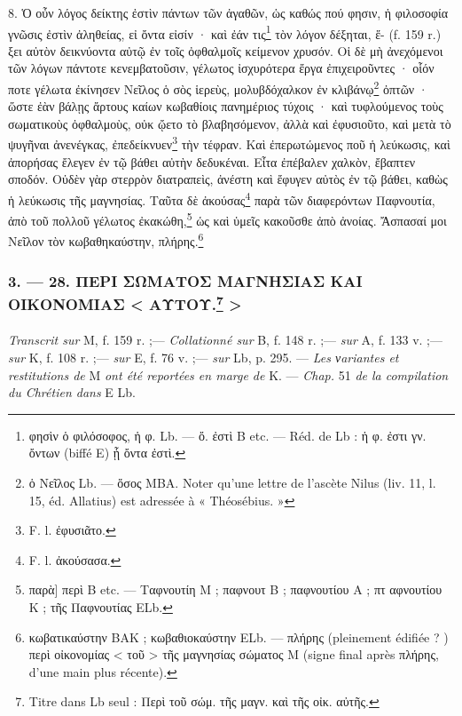 \documentclass[landscape, a4paper, 11pt, oneside, polutonikogreek, french]{article}
\begin{document}
8. Ὁ οὖν λόγος δείκτης ἐστὶν πάντων τῶν ἀγαθῶν, ὡς καθώς πού φησιν, ἡ φιλοσοφία γνῶσις ἐστὶν ἀληθείας, εἰ ὄντα εἰσίν · καὶ ἐάν τις\footnote{φησὶν ὁ φιλόσοφος, ἡ φ. Lb. --- ὄ. ἐστὶ B etc. --- Réd. de Lb : ἡ φ. ἐστι γν. ὄντων (biffé E) ᾗ ὄντα ἐστὶ.} τὸν λόγον δέξηται, ἕ- (f. 159 r.) ξει αὐτὸν δεικνύοντα αὐτῷ ἐν τοῖς ὀφθαλμοῖς κείμενον χρυσόν. Οἱ δὲ μὴ ἀνεχόμενοι τῶν λόγων πάντοτε κενεμβατοῦσιν, γέλωτος ἰσχυρότερα ἔργα ἐπιχειροῦντες · οἷόν ποτε γέλωτα ἐκίνησεν Νεῖλος ὁ σὸς ἱερεὺς, μολυβδόχαλκον ἐν κλιβάνῳ\footnote{ὁ Nεῖλος Lb. --- ὅσος MBA. Noter qu'une lettre de l'ascète Nilus (liv. 11, l. 15, éd. Allatius) est adressée à « Théosébius. »} ὀπτῶν · ὥστε ἐὰν βάλῃς ἄρτους καίων κωβαθίοις πανημέριος τύχοις · καὶ τυφλούμενος τοὺς σωματικοὺς ὀφθαλμοὺς, οὐκ ᾤετο τὸ βλαβησόμενον, ἀλλὰ καὶ ἐφυσιοῦτο, καὶ μετὰ τὸ ψυγῆναι ἀνενέγκας, ἐπεδείκνυεν\footnote{F. l. ἐφυσιᾶτο.} τὴν τέφραν. Καὶ ἐπερωτώμενος ποῦ ἡ λεύκωσις, καὶ ἀπορήσας ἔλεγεν ἐν τῷ βάθει αὐτὴν δεδυκέναι. Εἶτα ἐπέβαλεν χαλκὸν, ἔβαπτεν σποδόν. Οὐδὲν γὰρ στερρὸν διατραπεὶς, ἀνέστη καὶ ἔφυγεν αὐτὸς ἐν τῷ βάθει, καθὼς ἡ λεύκωσις τῆς μαγνησίας. Ταῦτα δὲ ἀκούσας\footnote{F. l. ἀκούσασα.} παρὰ τῶν διαφερόντων Παφνουτία, ἀπὸ τοῦ πολλοῦ γέλωτος ἐκακώθη,\footnote{παρὰ] περὶ B etc. --- Tαφνουτίη M ; παφνουτ B ; παφνουτίου A ; πτ αφνουτίου K ; τῆς Παφνουτίας ELb.} ὡς καὶ ὑμεῖς κακοῦσθε ἀπὸ ἀνοίας. Ἄσπασαί μοι Νεῖλον τὸν κωβαθηκαύστην, πλήρης.\footnote{κωβατικαύστην BAK ; κωβαθιοκαύστην ELb. --- πλήρης (pleinement édifiée ? ) περὶ οἰκονομίας < τοῦ > τῆς μαγνησίας σώματος M (signe final après πλήρης, d'une main plus récente).}

\bigskip
\centerline{\EightStarTaper}
\centerline{\EightStarTaper\EightStarTaper}
\bigskip

\subsubsection[3. --- 28. ΠΕΡΙ ΣΩΜΑΤΟΣ ΜΑΓΝΗΣΙΑΣ ΚΑΙ ΟΙΚΟΝΟΜΙΑΣ < ΑΥΤΟΥ. >]{3. --- 28. ΠΕΡΙ ΣΩΜΑΤΟΣ ΜΑΓΝΗΣΙΑΣ ΚΑΙ ΟΙΚΟΝΟΜΙΑΣ < ΑΥΤΟΥ.\footnote{Titre dans Lb seul : Περὶ τοῦ σώμ. τῆς μαγν. καὶ τῆς οἰκ. αὐτῆς.} >}
\paragraph{}
\emph{Transcrit sur} M, f. 159 r. ;--- \emph{Collationné sur} B, f. 148 r. ;--- \emph{sur} A, f. 133 v. ;--- \emph{sur} K, f. 108 r. ;--- \emph{sur} E, f. 76 v. ;--- \emph{sur} Lb, p. 295. --- \emph{Les νariantes et restitutions de} M \emph{ont été reportées en marge de} K. --- \emph{Chap.} 51 \emph{de la compilation du Chrétien dans} E Lb.
\end{document}
